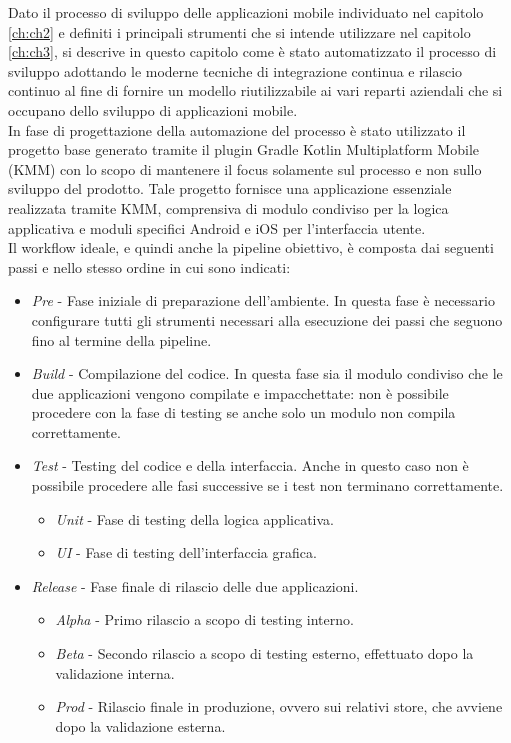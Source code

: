 
Dato il processo di sviluppo delle applicazioni mobile individuato nel capitolo \ref{ch:ch2} e definiti i principali strumenti che si intende utilizzare nel capitolo \ref{ch:ch3}, si descrive in questo capitolo come è stato automatizzato il processo di sviluppo adottando le moderne tecniche di integrazione continua e rilascio continuo al fine di fornire un modello riutilizzabile ai vari reparti aziendali che si occupano dello sviluppo di applicazioni mobile.\\
In fase di progettazione della automazione del processo è stato utilizzato il progetto base generato tramite il plugin Gradle Kotlin Multiplatform Mobile (KMM) con lo scopo di mantenere il focus solamente sul processo e non sullo sviluppo del prodotto. Tale progetto fornisce una applicazione essenziale realizzata tramite KMM, comprensiva di modulo condiviso per la logica applicativa e moduli specifici Android e iOS per l'interfaccia utente.\\
Il workflow ideale, e quindi anche la pipeline obiettivo, è composta dai seguenti passi e nello stesso ordine in cui sono indicati:
\begin{itemize}
    \item \textit{Pre} - Fase iniziale di preparazione dell'ambiente. In questa fase è necessario configurare tutti gli strumenti necessari alla esecuzione dei passi che seguono fino al termine della pipeline.
    \item \textit{Build} - Compilazione del codice. In questa fase sia il modulo condiviso che le due applicazioni vengono compilate e impacchettate: non è possibile procedere con la fase di testing se anche solo un modulo non compila correttamente.
    \item \textit{Test} - Testing del codice e della interfaccia. Anche in questo caso non è possibile procedere alle fasi successive se i test non terminano correttamente.
    \begin{itemize}
        \item \textit{Unit} - Fase di testing della logica applicativa.
        \item \textit{UI} - Fase di testing dell'interfaccia grafica.
    \end{itemize}
    \item \textit{Release} - Fase finale di rilascio delle due applicazioni.
    \begin{itemize}
        \item \textit{Alpha} - Primo rilascio a scopo di testing interno.
        \item \textit{Beta} - Secondo rilascio a scopo di testing esterno, effettuato dopo la validazione interna.
        \item \textit{Prod} - Rilascio finale in produzione, ovvero sui relativi store, che avviene dopo la validazione esterna.
    \end{itemize}
\end{itemize}

